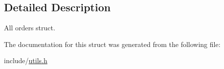 \subsection{Detailed Description}
All orders struct. 

The documentation for this struct was generated from the following file\+:\begin{DoxyCompactItemize}
\item 
include/\hyperlink{utils_8h}{utils.\+h}\end{DoxyCompactItemize}
